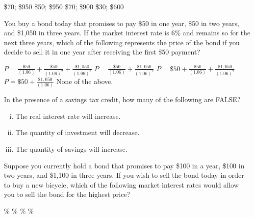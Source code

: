 \documentclass[addpoints,11pt]{exam}
\theoremstyle{definition}
\begin{document}
\begin{questions}
\begin{choices}
	\CorrectChoice \$70; \$950
	\choice \$50; \$950
	\choice \$70; \$900
	\choice \$30; \$600
\end{choices}

\newpage

\question You buy a bond today that promises to pay \$50 in one year, \$50 in two years, and \$1,050 in three years. If the market interest rate is 6\% and remains so for the next three years, which of the following represents the price of the bond if you decide to sell it in one year after receiving the first \$50 payment?

\begin{choices}
	\choice $P = \frac{\$50}{(1.06)} + \frac{\$50}{(1.06)^2} + \frac{\$1,050}{(1.06)^3}$
	\CorrectChoice $P = \frac{\$50}{(1.06)} + \frac{\$1,050}{(1.06)^2}$
	\choice $P = \$50 + \frac{\$50}{(1.06)} + \frac{\$1,050}{(1.06)^2}$
	\choice $P = \$50 + \frac{\$1,050}{(1.06)}$
	\choice None of the above.
\end{choices}



\question In the presence of a savings tax credit, how many of the following are FALSE?

\begin{enumerate}[(i)]
	\item The real interest rate will increase.
	\item The quantity of investment will decrease.
	\item The quantity of savings will increase.
\end{enumerate}

\begin{choices}
\end{choices}



\question Suppose you currently hold a bond that promises to pay \$100 in a year, \$100 in two years, and \$1,100 in three years. If you wish to sell the bond today in order to buy a new bicycle, which of the following market interest rates would allow you to sell the bond for the highest price?
\begin{choices}
	\%
	\%
	\%
	\%
\end{choices}

	





\end{questions}
\end{document}
